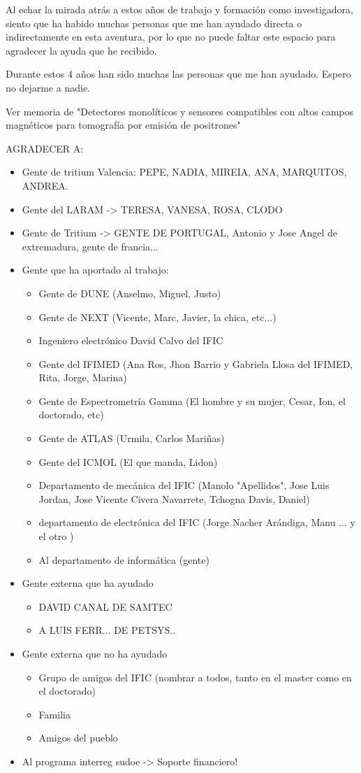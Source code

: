 Al echar la mirada atrás a estos años de trabajo y formación como investigadora, siento que ha habido muchas personas que me han ayudado directa o indirectamente en esta aventura, por lo que no puede faltar este espacio para agradecer la ayuda que he recibido.

Durante estos 4 años han sido muchas las personas que me han ayudado. Espero no dejarme a nadie.

Ver memoria de "Detectores monolíticos y sensores compatibles con altos campos magnéticos para tomografía por emisión de positrones"


AGRADECER A:

\begin{itemize}
\item{} Gente de tritium Valencia: PEPE, NADIA, MIREIA, ANA, MARQUITOS, ANDREA.
\item{} Gente del LARAM -> TERESA, VANESA, ROSA, CLODO
\item{} Gente de Tritium -> GENTE DE PORTUGAL, Antonio y Jose Angel de extremadura, gente de francia...  
\item{} Gente que ha aportado al trabajo:
\begin{itemize}
\item{} Gente de DUNE (Anselmo, Miguel, Justo)
\item{} Gente de NEXT (Vicente, Marc, Javier, la chica, etc...)
\item{} Ingeniero electrónico David Calvo del IFIC
\item{} Gente del IFIMED (Ana Ros, Jhon Barrio y Gabriela Llosa del IFIMED, Rita, Jorge, Marina)
\item{} Gente de Espectrometría Gamma (El hombre y su mujer, Cesar, Ion, el doctorado, etc)
\item{} Gente de ATLAS (Urmila, Carlos Mariñas)
\item{} Gente del ICMOL (El que manda, Lidon)
\item{} Departamento de mecánica del IFIC (Manolo "Apellidos", Jose Luis Jordan, Jose Vicente Civera Navarrete, Tchogna Davis, Daniel)
\item{} departamento de electrónica del IFIC (Jorge Nacher Arándiga, Manu ... y el otro )
\item{} Al departamento de informática (gente)
\end{itemize}
\item{} Gente externa que ha ayudado
\begin{itemize}
\item{} DAVID CANAL DE SAMTEC
\item{} A LUIS FERR... DE PETSYS..
\end{itemize}
\item{} Gente externa que no ha ayudado
\begin{itemize}
\item{} Grupo de amigos del IFIC (nombrar a todos, tanto en el master como en el doctorado)
\item{} Familia
\item{} Amigos del pueblo
\end{itemize}
\item{} Al programa interreg sudoe -> Soporte financiero!
\end{itemize} 



